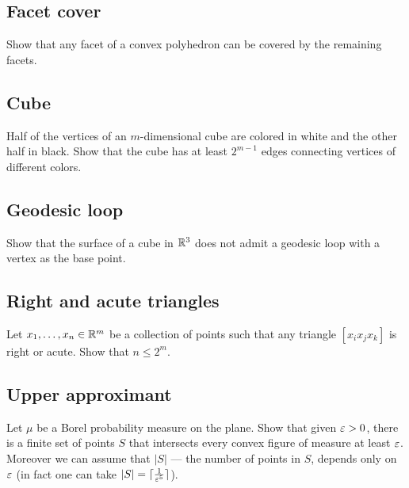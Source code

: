 \subsection*{Facet cover}\label{Facet cover}

\begin{pr}
Show that any facet of a convex polyhedron can be covered by the remaining facets.
\end{pr}


\subsection*{Cube}\label{Cube}

\begin{pr}
Half of the vertices 
of an $m$-dimensional cube
are colored in white and the other half in black.
Show that the cube has at least $2^{m-1}$ edges connecting vertices of different colors. 
\end{pr}

\subsection*{Geodesic loop}\label{Geodesic loop}

\begin{pr}
Show that the surface of a cube in $\mathbb{R}^3$
does not admit a geodesic loop with a vertex as the base point.
\end{pr}

\subsection*{Right and acute triangles}\label{Right and acute triangles}

\begin{pr}
Let $x_1,\dots,x_n\in\mathbb{R}^m$
be a collection of points such that any triangle $[x_ix_jx_k]$ is right or acute.
Show that $n\le 2^m$.
\end{pr}

\subsection*{Upper approximant}\label{One-sided approximants}

\begin{pr}
Let $\mu$ be a Borel probability measure on the plane.
Show that given $\varepsilon>0$, there is a finite set of points $S$ that intersects every convex figure of measure at least $\varepsilon$.
Moreover we can assume that $|S|$ --- the number of points in $S$, depends only on $\varepsilon$ (in fact one can take $|S|=\lceil\tfrac1{\varepsilon^5}\rceil$).
\end{pr}

